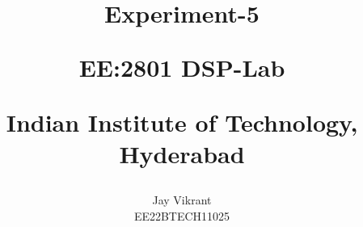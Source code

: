 \documentclass[journal,12pt,onecolumn]{IEEEtran}
\theoremstyle{remark}
\begin{document}
%




\vspace{3cm}

\title{
Experiment-5

\large{EE:2801 DSP-Lab}

Indian Institute of Technology, Hyderabad
}
\author{Jay Vikrant

EE22BTECH11025
}	


%
%
%

% 
%



% 
\end{document}
